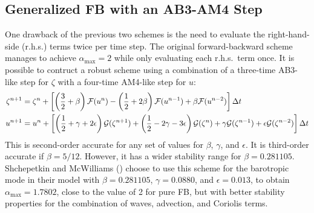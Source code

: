 \subsection{Generalized FB with an AB3-AM4 Step}
One drawback of the previous two schemes is the need to evaluate the
right-hand-side (r.h.s.) terms twice per time step. The original
forward-backward scheme manages to achieve $\alpha_{\max}
= 2$ while only evaluating each r.h.s.\ term once. It is possible to
contruct a robust scheme using a combination of a three-time
AB3-like step for $\zeta$ with a four-time AM4-like step for $u$:
\begin{equation}\begin{split}
   \zeta^{n+1} &= \zeta^n + \left[ \left( \frac{3}{2}+\beta \right)
   {\cal F}(u^n) - \left( \frac{1}{2}+ 2\beta \right) {\cal F}(u^{n-1}) +
   \beta {\cal F}(u^{n-2}) \right] \Delta t \\
   u^{n+1} &= u^n + \left[ \left( \frac{1}{2}+\gamma + 2\epsilon \right)
   {\cal G}(\zeta^{n+1}) +
   \left( \frac{1}{2}-2\gamma-3\epsilon \right){\cal G}(\zeta^n) +
   \gamma {\cal G}(\zeta^{n-1}) + \epsilon  {\cal G}(\zeta^{n-2}) \right]
   \Delta t
\end{split}\end{equation}
This is second-order accurate for any set of values for $\beta$,
$\gamma$, and $\epsilon$. It is third-order accurate if $\beta =
5/12$. However, it has a wider stability range for $\beta =
0.281105$. Shchepetkin and McWilliams (\cite{SS2008b}) choose to use
this scheme for the barotropic mode in their model with $\beta=
0.281105$, $\gamma = 0.0880$, and $\epsilon = 0.013$, to obtain
$\alpha_{\max} = 1.7802$, close to the value of 2 for
pure FB, but with better stability properties for the combination of
waves, advection, and Coriolis terms.
